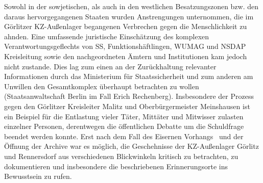 Sowohl in der sowjetischen, als auch in den westlichen Besatzungszonen bzw. den daraus hervorgegangenen Staaten wurden Anstrengungen unternommen, die im Görlitzer KZ-Außenlager begangenen Verbrechen gegen die Menschlichkeit zu ahnden. Eine umfassende juristische Einschätzung des komplexen Verantwortungsgeflechts von SS, Funktionshäftlingen, WUMAG und \mbox{NSDAP} Kreisleitung sowie den nachgeordneten Ämtern und Institutionen kam jedoch nicht zustande. Dies lag zum einen an der Zurückhaltung relevanter Informationen durch das Ministerium für Staatssicherheit und zum anderen am Unwillen den Gesamtkomplex überhaupt betrachten zu wollen (Staatsanwaltschaft Berlin im Fall Erich Rechenberg). Insbesondere der Prozess gegen den Görlitzer Kreisleiter Malitz und Oberbürgermeister Meinshausen ist ein Beispiel für die Entlastung vieler Täter, Mittäter und Mitwisser zulasten einzelner Personen, derentwegen die öffentlichen Debatte um die Schuldfrage beendet werden konnte. Erst nach dem Fall des \glqq Eisernen Vorhangs\grqq~ und der Öffnung der Archive war es möglich, die Geschehnisse der KZ-Außenlager Görlitz und Rennersdorf aus verschiedenen Blickwinkeln kritisch zu betrachten, zu dokumentieren und insbesondere die beschriebenen Erinnerungsorte ins Bewusstsein zu rufen. 




